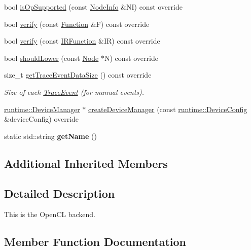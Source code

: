 \begin{DoxyCompactItemize}
bool \hyperlink{classglow_1_1_o_c_l_backend_a806d6c32ec42e9a9bdd9f5796800dae6}{is\+Op\+Supported} (const \hyperlink{classglow_1_1_node_info}{Node\+Info} \&NI) const override
\item 
bool \hyperlink{classglow_1_1_o_c_l_backend_a4e7432c28997e04d398ab5310e7f64f0}{verify} (const \hyperlink{classglow_1_1_function}{Function} \&F) const override
\item 
bool \hyperlink{classglow_1_1_o_c_l_backend_aa8e73591e3340113c10d5c5c86ccb642}{verify} (const \hyperlink{classglow_1_1_i_r_function}{I\+R\+Function} \&IR) const override
\item 
bool \hyperlink{classglow_1_1_o_c_l_backend_afadf9ab6b9686d5227ed285cfd3b8db1}{should\+Lower} (const \hyperlink{classglow_1_1_node}{Node} $\ast$N) const override
\item 
\mbox{\label{classglow_1_1_o_c_l_backend_a2e9a99e205ab2df9bac8d25a8ca43f7d}} 
size\+\_\+t \hyperlink{classglow_1_1_o_c_l_backend_a2e9a99e205ab2df9bac8d25a8ca43f7d}{get\+Trace\+Event\+Data\+Size} () const override
\begin{DoxyCompactList}\small\item\em Size of each \hyperlink{structglow_1_1_trace_event}{Trace\+Event} (for manual events). \end{DoxyCompactList}\item 
\hyperlink{classglow_1_1runtime_1_1_device_manager}{runtime\+::\+Device\+Manager} $\ast$ \hyperlink{classglow_1_1_o_c_l_backend_af3d1f85d01ed17ab2358ec4bdcff7b2f}{create\+Device\+Manager} (const \hyperlink{structglow_1_1runtime_1_1_device_config}{runtime\+::\+Device\+Config} \&device\+Config) override
\item 
\mbox{\label{classglow_1_1_o_c_l_backend_a468d3d77e2f4f58c43c33d2da5ce3440}} 
static std\+::string {\bfseries get\+Name} ()
\end{DoxyCompactItemize}
\subsection*{Additional Inherited Members}


\subsection{Detailed Description}
This is the Open\+CL backend. 

\subsection{Member Function Documentation}
\mbox{\label{classglow_1_1_o_c_l_backend_a0a058f7b6eac1efea438e171e56d9c6e}} 
